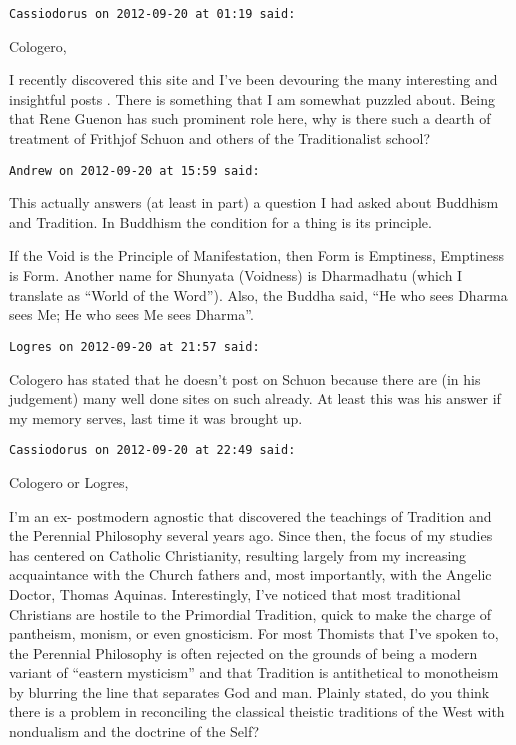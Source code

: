 \begin{footnotesize}\begin{sffamily}


\texttt{Cassiodorus on 2012-09-20 at 01:19 said: }

Cologero,

I recently discovered this site and I've been devouring the many interesting and insightful posts . There is something that I am somewhat puzzled about. Being that Rene Guenon has such prominent role here, why is there such a dearth of treatment of Frithjof Schuon and others of the Traditionalist school?


\hfill

\texttt{Andrew on 2012-09-20 at 15:59 said: }

This actually answers (at least in part) a question I had asked about Buddhism and Tradition. In Buddhism the condition for a thing is its principle.

If the Void is the Principle of Manifestation, then Form is Emptiness, Emptiness is Form. Another name for Shunyata (Voidness) is Dharmadhatu (which I translate as “World of the Word”). Also, the Buddha said, “He who sees Dharma sees Me; He who sees Me sees Dharma”.


\hfill

\texttt{Logres on 2012-09-20 at 21:57 said: }

Cologero has stated that he doesn't post on Schuon because there are (in his judgement) many well done sites on such already. At least this was his answer if my memory serves, last time it was brought up.


\hfill

\texttt{Cassiodorus on 2012-09-20 at 22:49 said: }

Cologero or Logres,

I'm an ex- postmodern agnostic that discovered the teachings of Tradition and the Perennial Philosophy several years ago. Since then, the focus of my studies has centered on Catholic Christianity, resulting largely from my increasing acquaintance with the Church fathers and, most importantly, with the Angelic Doctor, Thomas Aquinas. Interestingly, I've noticed that most traditional Christians are hostile to the Primordial Tradition, quick to make the charge of pantheism, monism, or even gnosticism. For most Thomists that I've spoken to, the Perennial Philosophy is often rejected on the grounds of being a modern variant of “eastern mysticism” and that Tradition is antithetical to monotheism by blurring the line that separates God and man. Plainly stated, do you think there is a problem in reconciling the classical theistic traditions of the West with nondualism and the doctrine of the Self?



\end{sffamily}
\end{footnotesize}
